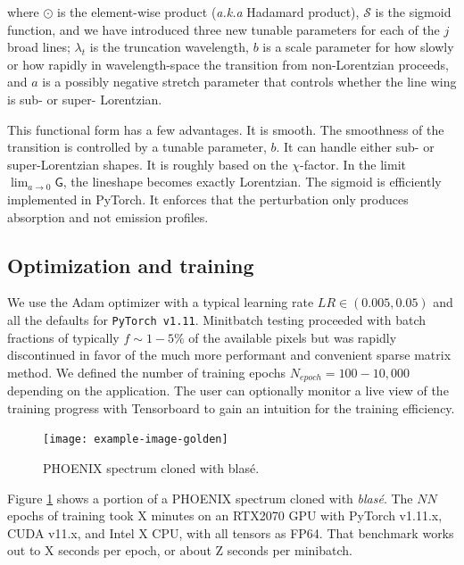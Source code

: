 \documentclass[modern]{aastex631}
\begin{document}
where $\odot$ is the element-wise product (\emph{a.k.a} Hadamard product), $\mathcal{S}$ is the sigmoid function, and we have introduced three new tunable parameters for each of the $j$ broad lines; $\lambda_t$ is the truncation wavelength, $b$ is a scale parameter for how slowly or how rapidly in wavelength-space the transition from non-Lorentzian proceeds, and $a$ is a possibly negative stretch parameter that controls whether the line wing is sub- or super- Lorentzian.

This functional form has a few advantages. It is smooth. The smoothness of the transition is controlled by a tunable parameter, $b$. It can handle either sub- or super-Lorentzian shapes. It is roughly based on the $\chi$-factor. In the limit $\lim_{a\to0} \mathsf{G}$, the lineshape becomes exactly Lorentzian. The sigmoid is efficiently implemented in PyTorch.
It enforces that the perturbation only produces absorption and not emission profiles.




\subsection{Optimization and training}

We use the Adam optimizer with a typical learning rate $LR\in (0.005, 0.05)$ and all the defaults for \texttt{PyTorch v1.11}. Minitbatch testing proceeded with batch fractions of typically $f\sim1-5\%$ of the available pixels but was rapidly discontinued in favor of the much more performant and convenient sparse matrix method. We defined the number of training epochs $N_{epoch}=100-10,000$ depending on the application. The user can optionally monitor a live view of the training progress with Tensorboard to gain an intuition for the training efficiency.


\begin{figure}[hbt!]
 \centering
 \texttt{[image: example-image-golden]}
 \caption{PHOENIX spectrum cloned with blas\'e.}
 \label{fig_cloned_spectrum_demo}
\end{figure}

Figure \ref{fig_cloned_spectrum_demo} shows a portion of a PHOENIX spectrum cloned with \emph{blas\'e}. The $NN$ epochs of training took X minutes on an RTX2070 GPU with PyTorch v1.11.x, CUDA v11.x, and Intel X CPU, with all tensors as FP64. That benchmark works out to X seconds per epoch, or about Z seconds per minibatch.
\end{document}
